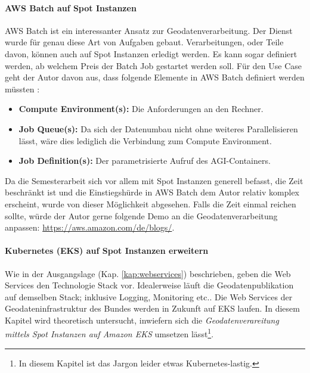 \paragraph{AWS Batch auf Spot Instanzen}
AWS Batch ist ein interessanter Ansatz zur Geodatenverarbeitung. Der Dienst wurde für genau diese Art von Aufgaben gebaut. Verarbeitungen, oder Teile davon, können auch auf Spot Instanzen erledigt werden. Es kann sogar definiert werden, ab welchem Preis der Batch Job gestartet werden soll. Für den Use Case geht der Autor davon aus, dass folgende Elemente in AWS Batch definiert werden müssten \cite{Batch2020}: 
\begin{itemize}
\item{\textbf{Compute Environment(s):} Die Anforderungen an den Rechner.}
\item{\textbf{Job Queue(s):} Da sich der Datenumbau nicht ohne weiteres Parallelisieren lässt, wäre dies lediglich die Verbindung zum Compute Environment.}
\item{\textbf{Job Definition(s):} Der parametrisierte Aufruf des AGI-Containers.}
\end{itemize}
Da die Semesterarbeit sich vor allem mit Spot Instanzen generell befasst, die Zeit beschränkt ist und die Einstiegshürde in AWS Batch dem Autor relativ komplex erscheint, wurde von dieser Möglichkeit abgesehen. Falls die Zeit einmal reichen sollte, würde der Autor gerne folgende Demo an die Geodatenverarbeitung anpassen:
\href{https://aws.amazon.com/de/blogs/compute/creating-a-simple-fetch-and-run-aws-batch-job/}{https://aws.amazon.com/de/blogs/}.

\paragraph{Kubernetes (EKS) auf Spot Instanzen erweitern}
Wie in der Ausgangslage (Kap. \ref{kap:webservices}) beschrieben, geben die Web Services den Technologie Stack vor. Idealerweise läuft die Geodatenpublikation auf demselben Stack; inklusive Logging, Monitoring etc.. 
Die Web Services der Geodateninfrastruktur des Bundes werden in Zukunft auf EKS laufen. In diesem Kapitel wird theoretisch untersucht, inwiefern sich die \textit{Geodatenverareitung mittels Spot Instanzen auf Amazon EKS} umsetzen lässt\footnote{In diesem Kapitel ist das Jargon leider etwas Kubernetes-lastig.}. 

